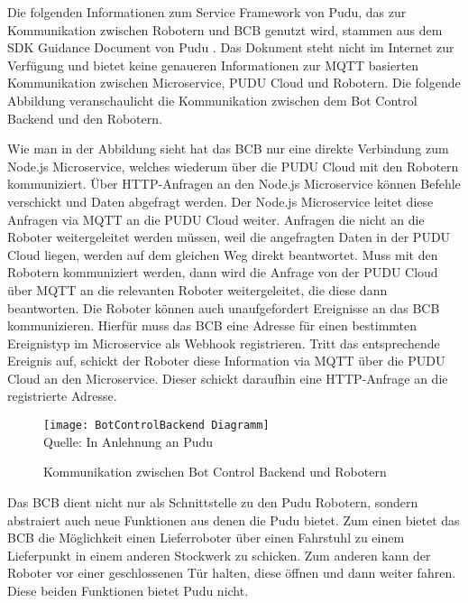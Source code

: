 Die folgenden Informationen zum Service Framework von Pudu, das zur Kommunikation zwischen Robotern und \ac{BCB} genutzt wird, stammen aus dem SDK Guidance Document von Pudu \cite{PuduSDK}. Das Dokument steht nicht im Internet zur Verfügung und bietet keine genaueren Informationen zur MQTT basierten Kommunikation zwischen Microservice, PUDU Cloud und Robotern. Die folgende Abbildung veranschaulicht die Kommunikation zwischen dem Bot Control Backend und den Robotern.

Wie man in der Abbildung sieht hat das \ac{BCB} nur eine direkte Verbindung zum Node.js Microservice, welches wiederum über die PUDU Cloud mit den Robotern kommuniziert. Über \gls{HTTP}-Anfragen an den Node.js Microservice können Befehle verschickt und Daten abgefragt werden. Der Node.js Microservice leitet diese Anfragen via \gls{MQTT} an die PUDU Cloud weiter. Anfragen die nicht an die Roboter weitergeleitet werden müssen, weil die angefragten Daten in der PUDU Cloud liegen, werden auf dem gleichen Weg direkt beantwortet. Muss mit den Robotern kommuniziert werden, dann wird die Anfrage von der PUDU Cloud über \gls{MQTT} an die relevanten Roboter weitergeleitet, die diese dann beantworten. Die Roboter können auch unaufgefordert Ereignisse an das \ac{BCB} kommunizieren. Hierfür muss das \ac{BCB} eine Adresse für einen bestimmten Ereignistyp im Microservice als \gls{Webhook} registrieren. Tritt das entsprechende Ereignis auf, schickt der Roboter diese Information via \gls{MQTT} über die PUDU Cloud an den Microservice. Dieser schickt daraufhin eine HTTP-Anfrage an die registrierte Adresse.

\begin{figure}[H]
\caption{Kommunikation zwischen Bot Control Backend und Robotern}
\texttt{[image: BotControlBackend Diagramm]}
\\
Quelle: In Anlehnung an Pudu \cite[S.~4]{PuduSDK}
\end{figure}

Das \ac{BCB} dient nicht nur als Schnittstelle zu den Pudu Robotern, sondern abstraiert auch neue Funktionen aus denen die Pudu bietet. Zum einen bietet das \ac{BCB} die Möglichkeit einen Lieferroboter über einen Fahrstuhl zu einem Lieferpunkt in einem anderen Stockwerk zu schicken. Zum anderen kann der Roboter vor einer geschlossenen Tür halten, diese öffnen und dann weiter fahren. Diese beiden Funktionen bietet Pudu nicht.


